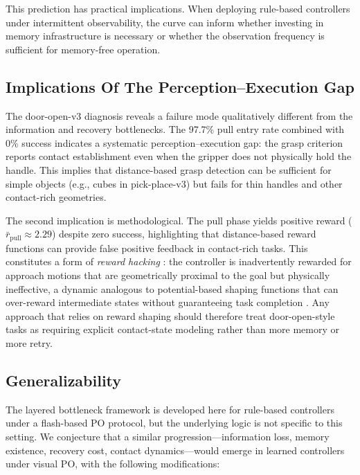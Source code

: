 This prediction has practical implications. When deploying rule-based controllers under intermittent observability, the curve can inform whether investing in memory infrastructure is necessary or whether the observation frequency is sufficient for memory-free operation.

\subsection{Implications Of The Perception--Execution Gap}

The door-open-v3 diagnosis reveals a failure mode qualitatively different from the information and recovery bottlenecks. The 97.7\% pull entry rate combined with 0\% success indicates a systematic perception--execution gap: the grasp criterion reports contact establishment even when the gripper does not physically hold the handle. This implies that distance-based grasp detection can be sufficient for simple objects (e.g., cubes in pick-place-v3) but fails for thin handles and other contact-rich geometries.

The second implication is methodological. The pull phase yields positive reward ($\bar{r}_{\text{pull}} \approx 2.29$) despite zero success, highlighting that distance-based reward functions can provide false positive feedback in contact-rich tasks. This constitutes a form of \emph{reward hacking} \citep{Amodei2016}: the controller is inadvertently rewarded for approach motions that are geometrically proximal to the goal but physically ineffective, a dynamic analogous to potential-based shaping functions that can over-reward intermediate states without guaranteeing task completion \citep{Ng1999}. Any approach that relies on reward shaping should therefore treat door-open-style tasks as requiring explicit contact-state modeling rather than more memory or more retry.

\subsection{Generalizability}

The layered bottleneck framework is developed here for rule-based controllers under a flash-based PO protocol, but the underlying logic is not specific to this setting. We conjecture that a similar progression---information loss, memory existence, recovery cost, contact dynamics---would emerge in learned controllers under visual PO, with the following modifications:

